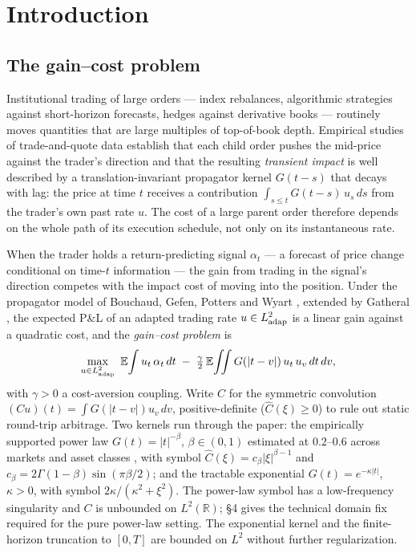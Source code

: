 \documentclass[11pt]{article}
\newcommand{\R}{\mathbb{R}}
\newcommand{\E}{\mathbb{E}}
\newcommand{\adap}{{\rm adap}}
\theoremstyle{plain}
\begin{document}
\section{Introduction}

\subsection{The gain--cost problem}

Institutional trading of large orders --- index rebalances, algorithmic strategies against short-horizon forecasts, hedges against derivative books --- routinely moves quantities that are large multiples of top-of-book depth. Empirical studies of trade-and-quote data \citep{LilloFarmerMantegna2003,BouchaudGefenPottersWyart2004,Gatheral2010,JusselinRosenbaum2020} establish that each child order pushes the mid-price against the trader's direction and that the resulting \emph{transient impact} is well described by a translation-invariant propagator kernel $G(t-s)$ that decays with lag: the price at time $t$ receives a contribution $\int_{s\le t}G(t-s)\,u_s\,ds$ from the trader's own past rate $u$. The cost of a large parent order therefore depends on the whole path of its execution schedule, not only on its instantaneous rate.

When the trader holds a return-predicting signal $\alpha_t$ --- a forecast of price change conditional on time-$t$ information --- the gain from trading in the signal's direction competes with the impact cost of moving into the position. Under the propagator model of Bouchaud, Gefen, Potters and Wyart \citeyearpar{BouchaudGefenPottersWyart2004}, extended by Gatheral \citeyearpar{Gatheral2010}, the expected P\&L of an adapted trading rate $u\in L^2_{\adap}$ is a linear gain against a quadratic cost, and the \emph{gain--cost problem} is
\begin{equation}\label{eq:gaincost}
\max_{u\in L^2_{\adap}}\ \E\!\int u_t\,\alpha_t\,dt \;-\; \tfrac{\gamma}{2}\,\E\!\iint G(|t-v|)\, u_t\, u_v\,dt\,dv,
\end{equation}
with $\gamma>0$ a cost-aversion coupling. Write $C$ for the symmetric convolution $(Cu)(t) = \int G(|t-v|)u_v\,dv$, positive-definite ($\hat C(\xi)\ge 0$) to rule out static round-trip arbitrage. Two kernels run through the paper: the empirically supported power law $G(t) = |t|^{-\beta}$, $\beta\in(0,1)$ estimated at $0.2$--$0.6$ across markets and asset classes \citep{LilloFarmerMantegna2003,BouchaudGefenPottersWyart2004,Gatheral2010,JusselinRosenbaum2020}, with symbol $\hat C(\xi) = c_\beta|\xi|^{\beta-1}$ and $c_\beta = 2\Gamma(1-\beta)\sin(\pi\beta/2)$; and the tractable exponential $G(t) = e^{-\kappa|t|}$, $\kappa>0$, with symbol $2\kappa/(\kappa^2+\xi^2)$. The power-law symbol has a low-frequency singularity and $C$ is unbounded on $L^2(\R)$; \S4 gives the technical domain fix required for the pure power-law setting. The exponential kernel and the finite-horizon truncation to $[0,T]$ are bounded on $L^2$ without further regularization.
\end{document}
